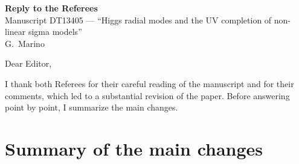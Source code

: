 \documentclass[11pt,a4paper]{article}
\begin{document}
\begin{center}
{\Large\bfseries Reply to the Referees}\\[4pt]
Manuscript DT13405 --- ``Higgs radial modes and the UV completion of non-linear sigma models''\\
G.~Marino
\end{center}

Dear Editor,

I thank both Referees for their careful reading of the manuscript and for their comments, which led to a substantial revision of the paper. Before answering point by point, I summarize the main changes.

\section*{Summary of the main changes}
\end{document}
